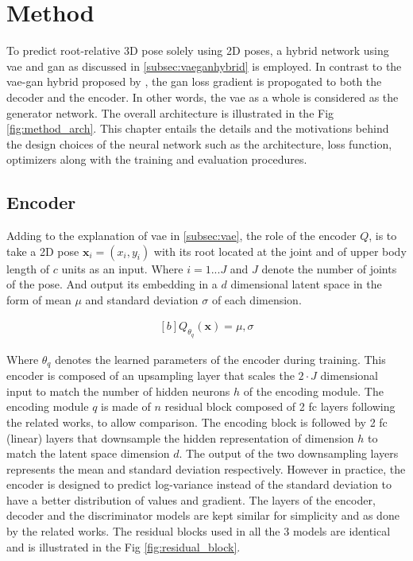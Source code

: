 \chapter{Method}
\label{chap:method}

To predict root-relative 3D pose solely using 2D poses, a hybrid network using \ac{vae} and \ac{gan} as discussed in \ref{subsec:vaeganhybrid} is employed. In contrast to the \ac{vae}-\ac{gan} hybrid proposed by \cite{autoencoding_beyond_pixels}, the \ac{gan} loss gradient is propogated to both the decoder and the encoder. In other words, the \ac{vae} as a whole is considered as the generator network. The overall architecture is illustrated in the Fig \ref{fig:method_arch}. This chapter entails the details and the motivations behind the design choices of the neural network such as the architecture, loss function, optimizers along with the training and evaluation procedures.

\section{Encoder}
Adding to the explanation of \ac{vae} in \ref{subsec:vae}, the role of the encoder $Q$, is to take a 2D pose $\textbf{x}_i = (x_i, y_i)$ with its root located at the joint and of upper body length of $c$ units as an input. Where $i = 1 ... J$ and $J$ denote the number of joints of the pose. And output its embedding in a $d$ dimensional latent space in the form of mean $\mu$ and standard deviation $\sigma$ of each dimension.

\begin{equation} \label{eqn:Q_fn}
    \begin{gathered}[b]
        Q_{\theta_q}(\textbf{x}) = \mu, \sigma
    \end{gathered}
\end{equation}

Where $\theta_q$ denotes the learned parameters of the encoder during training. This encoder is composed of an upsampling layer that scales the $2\!\cdot\!J$ dimensional input to match the number of hidden neurons $h$ of the encoding module. The encoding module $q$ is made of $n$ residual block composed of 2 \ac{fc} layers following the related works, to allow comparison. The encoding block is followed by 2 \ac{fc} (linear) layers that downsample the hidden representation of dimension $h$ to match the latent space dimension $d$. The output of the two downsampling layers represents the mean and standard deviation respectively. However in practice, the encoder is designed to predict log-variance instead of the standard deviation to have a better distribution of values and gradient. The layers of the encoder, decoder and the discriminator models are kept similar for simplicity and as done by the related works. The residual blocks used in all the 3 models are identical and is illustrated in the Fig \ref{fig:residual_block}.

